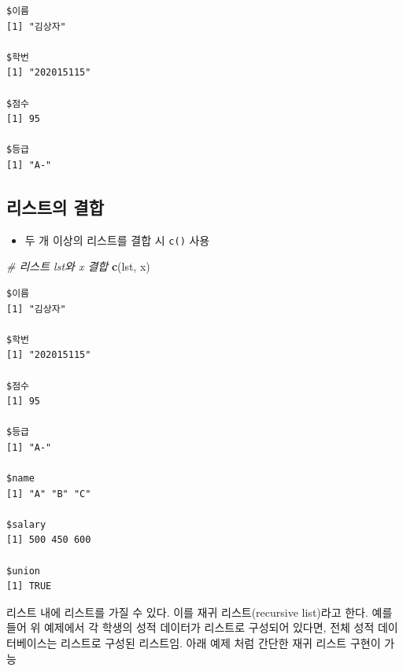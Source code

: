 \documentclass[
  11pt,
]{krantz}
\newenvironment{Shaded}{\begin{snugshade}}{\end{snugshade}}
\newcommand{\CommentTok}[1]{\textcolor[rgb]{0.37,0.37,0.37}{\textit{#1}}}
\newcommand{\KeywordTok}[1]{\textcolor[rgb]{0.27,0.27,0.27}{\textbf{#1}}}
\newcommand{\NormalTok}[1]{#1}
\providecommand{\tightlist}{%
  \setlength{\itemsep}{0pt}\setlength{\parskip}{0pt}}
\let\BeginKnitrBlock\begin \let\EndKnitrBlock\end
\begin{document}
\begin{verbatim}
$이름
[1] "김상자"

$학번
[1] "202015115"

$점수
[1] 95

$등급
[1] "A-"
\end{verbatim}

\normalsize

\hypertarget{list-combine}{%
\subsection{리스트의 결합}\label{list-combine}}

\begin{itemize}
\tightlist
\item
  두 개 이상의 리스트를 결합 시 \texttt{c()} 사용
\end{itemize}

\footnotesize

\begin{Shaded}
\begin{Highlighting}[]
\CommentTok{# 리스트 lst와 x 결합}
\KeywordTok{c}\NormalTok{(lst, x)}
\end{Highlighting}
\end{Shaded}

\begin{verbatim}
$이름
[1] "김상자"

$학번
[1] "202015115"

$점수
[1] 95

$등급
[1] "A-"

$name
[1] "A" "B" "C"

$salary
[1] 500 450 600

$union
[1] TRUE
\end{verbatim}

\normalsize

\footnotesize

\BeginKnitrBlock{rmdnote}
리스트 내에 리스트를 가질 수 있다. 이를 재귀 리스트(recursive list)라고 한다. 예를 들어 위 예제에서 각 학생의 성적 데이터가 리스트로 구성되어 있다면, 전체 성적 데이터베이스는 리스트로 구성된 리스트임. 아래 예제 처럼 간단한 재귀 리스트 구현이 가능
\EndKnitrBlock{rmdnote}

\normalsize

\footnotesize
\end{document}
